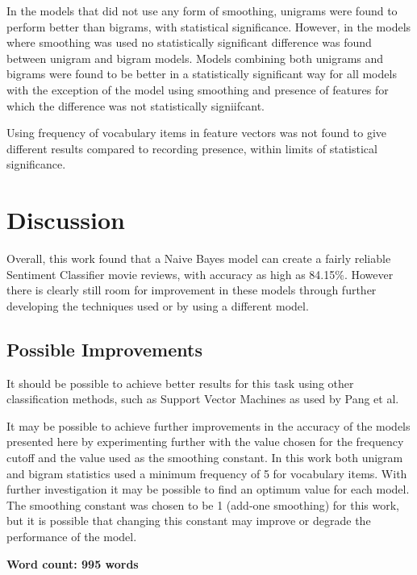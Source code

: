 \documentclass[twocolumn]{article}
\begin{document}
In the models that did not use any form of smoothing, unigrams were found to perform better than bigrams, with statistical significance. However, in the models where smoothing was used no statistically significant difference was found between unigram and bigram models. Models combining both unigrams and bigrams were found to be better in a statistically significant way for all models with the exception of the model using smoothing and presence of features for which the difference was not statistically signiifcant.

Using frequency of vocabulary items in feature vectors was not found to give different results compared to recording presence, within limits of statistical significance.

\section{Discussion}

Overall, this work found that a Naive Bayes model can create a fairly reliable Sentiment Classifier movie reviews, with accuracy as high as 84.15\%. However there is clearly still room for improvement in these models through further developing the techniques used or by using a different model.

\subsection{Possible Improvements}

It should be possible to achieve better results for this task using other classification methods, such as Support Vector Machines as used by Pang et al. 

It may be possible to achieve further improvements in the accuracy of the models presented here by experimenting further with the value chosen for the frequency cutoff and the value used as the smoothing constant. In this work both unigram and bigram statistics used a minimum frequency of 5 for vocabulary items. With further investigation it may be possible to find an optimum value for each model. The smoothing constant was chosen to be 1 (add-one smoothing) for this work, but it is possible that changing this constant may improve or degrade the performance of the model.





\textbf{Word count: 995 words}

{}

\end{document}
